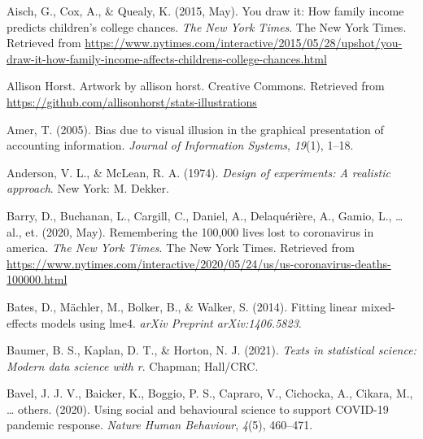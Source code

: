 \documentclass[print]{nuthesis}
\newlength{\cslhangindent}
\newenvironment{CSLReferences}[2]%
{\setlength{\parindent}{0pt}%
\everypar{\setlength{\hangindent}{\cslhangindent}}\ignorespaces}%
{\par}
\begin{document}
\noindent

\setlength{\parindent}{-0.20in}
\setlength{\leftskip}{0.20in}
\setlength{\parskip}{8pt}

\hypertarget{refs}{}
\begin{CSLReferences}{1}{0}
\leavevmode{}%
Aisch, G., Cox, A., \& Quealy, K. (2015, May). You draw it: How family income predicts children's college chances. \emph{The New York Times}. The New York Times. Retrieved from \url{https://www.nytimes.com/interactive/2015/05/28/upshot/you-draw-it-how-family-income-affects-childrens-college-chances.html}

\leavevmode{}%
Allison Horst. Artwork by allison horst. Creative Commons. Retrieved from \url{https://github.com/allisonhorst/stats-illustrations}

\leavevmode{}%
Amer, T. (2005). Bias due to visual illusion in the graphical presentation of accounting information. \emph{Journal of Information Systems}, \emph{19}(1), 1--18.

\leavevmode{}%
Anderson, V. L., \& McLean, R. A. (1974). \emph{Design of experiments: A realistic approach}. New York: M. Dekker.

\leavevmode{}%
Barry, D., Buchanan, L., Cargill, C., Daniel, A., Delaquérière, A., Gamio, L., \ldots{} al., et. (2020, May). Remembering the 100,000 lives lost to coronavirus in america. \emph{The New York Times}. The New York Times. Retrieved from \url{https://www.nytimes.com/interactive/2020/05/24/us/us-coronavirus-deaths-100000.html}

\leavevmode{}%
Bates, D., Mächler, M., Bolker, B., \& Walker, S. (2014). Fitting linear mixed-effects models using lme4. \emph{arXiv Preprint arXiv:1406.5823}.

\leavevmode{}%
Baumer, B. S., Kaplan, D. T., \& Horton, N. J. (2021). \emph{Texts in statistical science: Modern data science with r}. Chapman; Hall/CRC.

\leavevmode{}%
Bavel, J. J. V., Baicker, K., Boggio, P. S., Capraro, V., Cichocka, A., Cikara, M., \ldots{} others. (2020). Using social and behavioural science to support COVID-19 pandemic response. \emph{Nature Human Behaviour}, \emph{4}(5), 460--471.


\end{CSLReferences}
\end{document}

